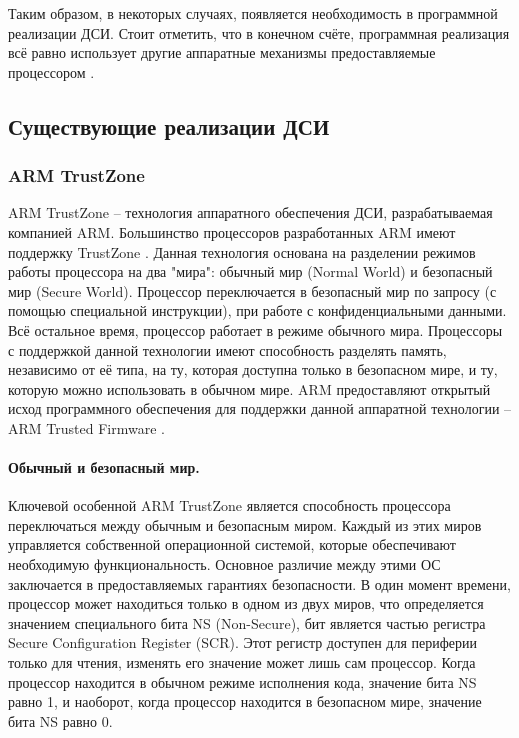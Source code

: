 Таким образом, в некоторых случаях, появляется необходимость в программной реализации ДСИ. Стоит отметить, что в конечном счёте, программная реализация всё равно использует другие аппаратные механизмы предоставляемые процессором \cite{comparsion-arm-intel}.
 
\subsection{Существующие реализации ДСИ}

\subsubsection{ARM TrustZone}

ARM TrustZone -- технология аппаратного обеспечения ДСИ, разрабатываемая компанией ARM. Большинство процессоров разработанных ARM имеют поддержку TrustZone \cite{comparsion-arm-intel}. Данная технология основана на разделении режимов работы процессора на два "мира": обычный мир (Normal World) и безопасный мир (Secure World). Процессор переключается в безопасный мир по запросу (с помощью специальной инструкции), при работе с конфиденциальными данными. Всё остальное время, процессор работает в режиме обычного мира. Процессоры с поддержкой данной технологии имеют способность разделять память, независимо от её типа, на ту, которая доступна только в безопасном мире, и ту, которую можно использовать в обычном мире. ARM предоставляют открытый исход программного обеспечения для поддержки данной аппаратной технологии -- ARM Trusted Firmware \cite{arm-tfa}.

\paragraph{Обычный и безопасный мир.}

Ключевой особенной ARM TrustZone является способность процессора переключаться между обычным и безопасным миром. Каждый из этих миров управляется собственной операционной системой, которые обеспечивают необходимую функциональность. Основное различие между этими ОС заключается в предоставляемых гарантиях безопасности. В один момент времени, процессор может находиться только в одном из двух миров, что определяется значением специального бита NS (Non-Secure), бит является частью регистра Secure Configuration Register (SCR). Этот регистр доступен для периферии только для чтения, изменять его значение может лишь сам процессор. Когда процессор находится в обычном режиме исполнения кода, значение бита NS равно 1, и наоборот, когда процессор находится в безопасном мире, значение бита NS равно 0.

